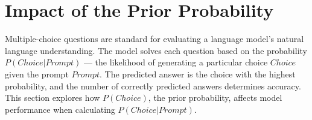 \section{Impact of the Prior Probability}
\label{sec:impact_of_prior_prob}
Multiple-choice questions are standard for evaluating a language model's natural language understanding. The model solves each question based on the probability {\small $P(Choice|Prompt)$} — the likelihood of generating a particular choice $Choice$ given the prompt $Prompt$. The predicted answer is the choice with the highest probability, and the number of correctly predicted answers determines accuracy. This section explores how {\small $P(Choice)$}, the prior probability, affects model performance when calculating {\small $P(Choice|Prompt)$}. 

\begin{table*}[!t]
    \centering
    \caption{The percentage of cases in which the log prior probability difference exceeds the PMI difference for each dataset. A high percentage value indicates that the model's decision is primarily driven by the prior probability difference, indicating limited influence from the prompt.}
    \vspace{-0.2\baselineskip} %
    \label{tab:comp_results}
\end{table*}

